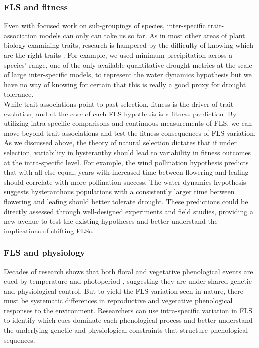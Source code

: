 \documentclass{article}
\begin{document}
\subsubsection*{FLS and fitness}
Even with focused work on sub-groupings of species, inter-specific trait-association models can only can take us so far. As in most other areas of plant biology examining traits, research is hampered by the difficulty of knowing which are the right traits \citep{Violle2007}. For example, we used minimum precipitation across a species' range, one of the only available quantitative drought metrics at the scale of large inter-specific models, to represent the water dynamics hypothesis but we have no way of knowing for certain that this is really a good proxy for drought tolerance. \\

\noindent While trait associations point to past selection, fitness is the driver of trait evolution, and at the core of each FLS hypothesis is a fitness prediction. By utilizing intra-specific comparisons and continuous measurements of FLS, we can move beyond trait associations and test the fitness consequences of FLS variation. As we discussed above, the theory of natural selection dictates that if under selection, variability in hysteranthy should lead to variability in fitness outcomes at the intra-specific level. For example, the wind pollination hypothesis predicts that with all else equal, years with increased time between flowering and leafing should correlate with more pollination success. The water dynamics hypothesis suggests hysteranthous populations with a consistently larger time between flowering and leafing should better tolerate drought. These predictions could be directly assessed through well-designed experiments and field studies, providing a new avenue to test the existing hypotheses and better understand the implications of shifting FLSs.\\

\subsubsection*{FLS and physiology} 
Decades of research shows that both floral and vegetative phenological events are cued by temperature and photoperiod \citep{Forrest2010, Flynn2018}, suggesting they are under shared genetic and physiological control. But to yield the FLS variation seen in nature, there must be systematic differences in reproductive and vegetative phenological responses to the environment. Researchers can use intra-specific variation in FLS to identify which cues dominate each phenological process and better understand the underlying genetic and physiological constraints that structure phenological sequences.\\
\end{document}

